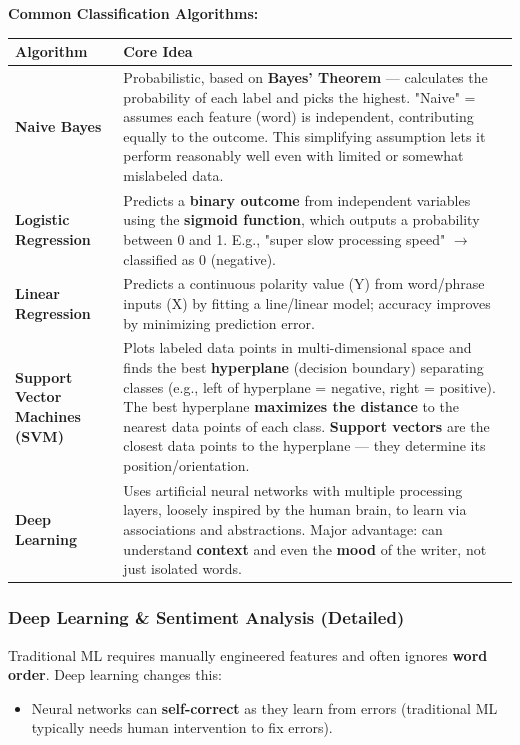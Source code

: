 \documentclass[12pt,openany]{book}
\begin{document}
\textbf{Common Classification Algorithms:}

\begin{center}
\begin{tabular}{|L{0.30\textwidth}|L{0.60\textwidth}|}
\hline
Algorithm & Core Idea \\
\hline
\textbf{Naive Bayes} & Probabilistic, based on \textbf{Bayes' Theorem} --- calculates the probability of each label and picks the highest. "Naive" = assumes each feature (word) is independent, contributing equally to the outcome. This simplifying assumption lets it perform reasonably well even with limited or somewhat mislabeled data. \\
\hline
\textbf{Logistic Regression} & Predicts a \textbf{binary outcome} from independent variables using the \textbf{sigmoid function}, which outputs a probability between 0 and 1. E.g., "super slow processing speed" \(\rightarrow\) classified as 0 (negative). \\
\hline
\textbf{Linear Regression} & Predicts a continuous polarity value (Y) from word/phrase inputs (X) by fitting a line/linear model; accuracy improves by minimizing prediction error. \\
\hline
\textbf{Support Vector Machines (SVM)} & Plots labeled data points in multi-dimensional space and finds the best \textbf{hyperplane} (decision boundary) separating classes (e.g., left of hyperplane = negative, right = positive). The best hyperplane \textbf{maximizes the distance} to the nearest data points of each class. \textbf{Support vectors} are the closest data points to the hyperplane --- they determine its position/orientation. \\
\hline
\textbf{Deep Learning} & Uses artificial neural networks with multiple processing layers, loosely inspired by the human brain, to learn via associations and abstractions. Major advantage: can understand \textbf{context} and even the \textbf{mood} of the writer, not just isolated words. \\
\hline
\end{tabular}
\end{center}

\subsubsection{Deep Learning \& Sentiment Analysis (Detailed)}

Traditional ML requires manually engineered features and often ignores \textbf{word order}. Deep learning changes this:
\begin{itemize}[leftmargin=*]
    \item Neural networks can \textbf{self-correct} as they learn from errors (traditional ML typically needs human intervention to fix errors).
\end{itemize}
\end{document}
